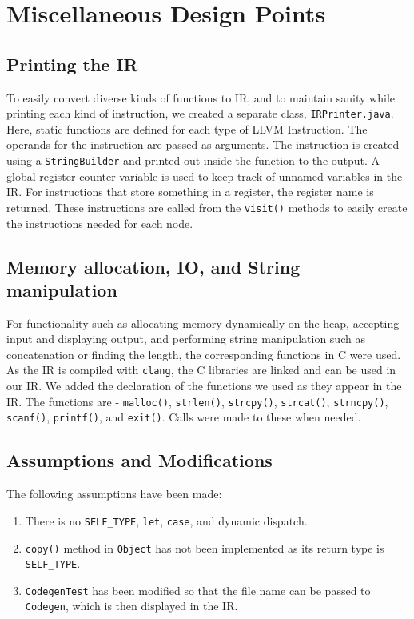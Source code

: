 \documentclass{article}
\begin{document}
\section{Miscellaneous Design Points}

\subsection{Printing the IR}
To easily convert diverse kinds of functions to IR, and to maintain sanity while printing each kind of instruction, we created a separate class, \verb|IRPrinter.java|. Here, static functions are defined for each type of LLVM Instruction. The operands for the instruction are passed as arguments. The instruction is created using a \verb|StringBuilder| and printed out inside the function to the output. A global register counter variable is used to keep track of unnamed variables in the IR. For instructions that store something in a register, the register name is returned. These instructions are called from the \verb|visit()| methods to easily create the instructions needed for each node.

\subsection{Memory allocation, IO, and String manipulation}
For functionality such as allocating memory dynamically on the heap, accepting input and displaying output, and performing string manipulation such as concatenation or finding the length, the corresponding functions in C were used. As the IR is compiled with \verb|clang|, the C libraries are linked and can be used in our IR. We added the declaration of the functions we used as they appear in the IR. The functions are - \verb|malloc()|, \verb|strlen()|, \verb|strcpy()|, \verb|strcat()|, \verb|strncpy()|, \verb|scanf()|, \verb|printf()|, and \verb|exit()|. Calls were made to these when needed.

\subsection{Assumptions and Modifications}
The following assumptions have been made:
\begin{enumerate}
	\item There is no \verb|SELF_TYPE|, \verb|let|, \verb|case|, and dynamic dispatch.
	\item \verb|copy()| method in \verb|Object| has not been implemented as its return type is \verb|SELF_TYPE|.
	\item \verb|CodegenTest| has been modified so that the file name can be passed to \verb|Codegen|, which is then displayed in the IR.
\end{enumerate}
\end{document}
